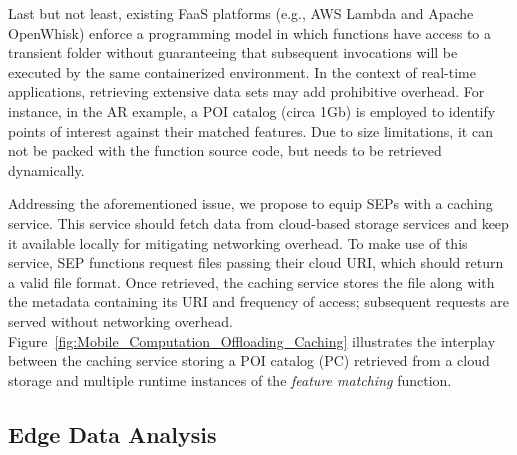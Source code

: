 Last but not least, existing FaaS platforms (e.g., AWS Lambda and Apache OpenWhisk) enforce a programming model in which functions have access to a transient folder without guaranteeing that subsequent invocations will be executed by the same containerized environment. %
In the context of real-time applications, retrieving extensive data sets may add prohibitive overhead. For instance, in the AR example, a POI catalog (circa 1Gb) is employed to identify points of interest against their matched features. Due to size limitations, it can not be packed with the function source code, but needs to be retrieved dynamically.

Addressing the aforementioned issue, we propose to equip SEPs with a caching service. This service should fetch data from cloud-based storage services and keep it available locally for mitigating networking overhead. 
To make use of this service, SEP functions request files passing their cloud URI, which should return a valid file format.
Once retrieved, the caching service stores the file along with the metadata containing its URI and frequency of access; subsequent requests are served without networking overhead. 
Figure~\ref{fig:Mobile_Computation_Offloading_Caching} illustrates the interplay between the caching service storing a POI catalog (PC) retrieved from a cloud storage and multiple runtime instances of the \textit{feature matching} function.



\subsection{Edge Data Analysis}

